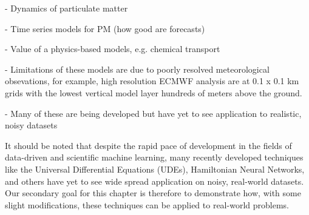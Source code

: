 



- Dynamics of particulate matter


- Time series models for PM (how good are forecasts)


- Value of a physics-based models, e.g. chemical transport

- Limitations of these models are due to poorly resolved meteorological
obsevations, for example, high resolution ECMWF analysis are at 0.1 x 0.1 km
grids with the lowest vertical model layer hundreds of meters above the ground.

- Many of these are being developed but have yet to see application to
realistic, noisy datasets




It should be noted that
despite the rapid pace of development in the fields of data-driven and
scientific machine learning, many recently developed techniques like the
Universal Differential Equations (UDEs), Hamiltonian Neural Networks, and others
have yet to see wide spread application on noisy, real-world datasets. Our
secondary goal for this chapter is therefore to demonstrate how, with some
slight modifications, these techniques can be applied to real-world problems.


